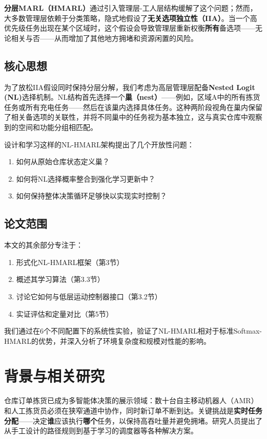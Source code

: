 \documentclass[12pt,a4paper]{article}
\begin{document}
\textbf{分层MARL（HMARL）}通过引入管理层-工人层结构缓解了这个问题；然而，大多数管理层依赖于分类策略，隐式地假设了\textbf{无关选项独立性（IIA）}。当一个高优先级任务出现在某个区域时，这个假设会导致管理层重新权衡\textbf{所有}备选项——无论相关与否——从而增加了其他地方拥堵和资源闲置的风险。

\subsection{核心思想}

为了放松IIA假设同时保持分层分解，我们考虑为高层管理层配备\textbf{Nested Logit (NL)}选择机制。NL结构首先选择一个\textbf{巢（nest）}——例如，区域A中的所有拣货任务或所有充电任务——然后在该巢内选择具体任务。这种两阶段视角在巢内保留了相关备选项的关联性，并将不同巢中的任务视为基本独立，这与真实仓库中观察到的空间和功能分组相匹配。

设计和学习这样的NL-HMARL架构提出了几个开放性问题：
\begin{enumerate}
\item 如何从原始仓库状态定义巢？
\item 如何将NL选择概率整合到强化学习更新中？
\item 如何保持整体决策循环足够快以实现实时控制？
\end{enumerate}

\subsection{论文范围}

本文的其余部分专注于：
\begin{enumerate}
\item 形式化NL-HMARL框架（第3节）
\item 概述其学习算法（第3.3节）
\item 讨论它如何与低层运动控制器接口（第3.2节）
\item 实证评估和定量对比（第5节）
\end{enumerate}

我们通过在6个不同配置下的系统性实验，验证了NL-HMARL相对于标准Softmax-HMARL的优势，并深入分析了环境复杂度和规模对性能的影响。

\section{背景与相关研究}

仓库订单拣货已成为多智能体决策的展示领域：数十台自主移动机器人（AMR）和人工拣货员必须在狭窄通道中协作，同时新订单不断到达。关键挑战是\textbf{实时任务分配}——决定\textbf{谁}应该执行\textbf{哪个}任务，以保持高吞吐量并避免拥堵。研究人员提出了从手工设计的路径规则到基于学习的调度器等各种解决方案。
\end{document}

